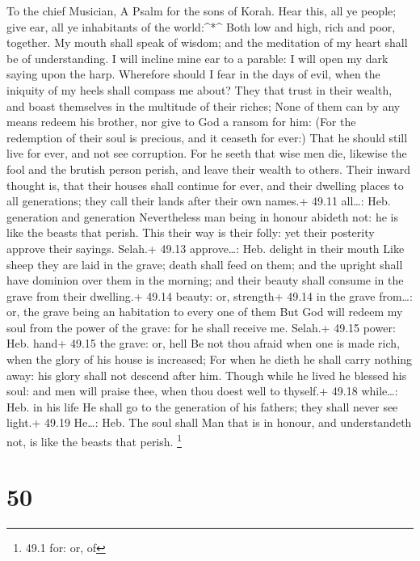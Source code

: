 To the chief Musician, A Psalm for the sons of Korah.  Hear
this, all ye people; give ear, all ye inhabitants of the world:\^{}*\^{}
 Both low and high, rich and poor, together.  My
mouth shall speak of wisdom; and the meditation of my heart shall be of
understanding.  I will incline mine ear to a parable: I will
open my dark saying upon the harp.  Wherefore should I fear
in the days of evil, when the iniquity of my heels shall compass me
about?  They that trust in their wealth, and boast
themselves in the multitude of their riches;  None of them
can by any means redeem his brother, nor give to God a ransom for him:
 (For the redemption of their soul is precious, and it
ceaseth for ever:)  That he should still live for ever, and
not see corruption.  For he seeth that wise men die,
likewise the fool and the brutish person perish, and leave their wealth
to others.  Their inward thought is, that their houses
shall continue for ever, and their dwelling places to all generations;
they call their lands after their own names.+ 49.11 all\ldots: Heb.
generation and generation  Nevertheless man being in honour
abideth not: he is like the beasts that perish.  This their
way is their folly: yet their posterity approve their sayings. Selah.+
49.13 approve\ldots: Heb. delight in their mouth  Like
sheep they are laid in the grave; death shall feed on them; and the
upright shall have dominion over them in the morning; and their beauty
shall consume in the grave from their dwelling.+ 49.14 beauty: or,
strength+ 49.14 in the grave from\ldots: or, the grave being an
habitation to every one of them  But God will redeem my
soul from the power of the grave: for he shall receive me. Selah.+ 49.15
power: Heb. hand+ 49.15 the grave: or, hell  Be not thou
afraid when one is made rich, when the glory of his house is increased;
 For when he dieth he shall carry nothing away: his glory
shall not descend after him.  Though while he lived he
blessed his soul: and men will praise thee, when thou doest well to
thyself.+ 49.18 while\ldots: Heb. in his life  He shall go
to the generation of his fathers; they shall never see light.+ 49.19
He\ldots: Heb. The soul shall  Man that is in honour, and
understandeth not, is like the beasts that perish. \footnote{49.1 for:
  or, of}

\hypertarget{section-49}{%
\section{50}\label{section-49}}

